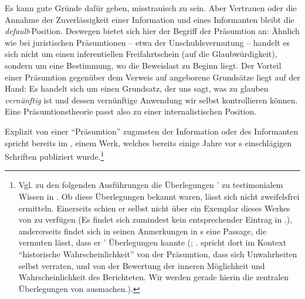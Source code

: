 Es kann gute Gründe dafür geben, misstrauisch zu sein. Aber Vertrauen oder die
Annahme der Zuverlässigkeit einer Information und eines Informanten bleibt die
\emph{default}-Position. Deswegen bietet sich hier der Begriff der Präsumtion
an: Ähnlich wie bei juristischen Präsumtionen -- etwa der Unschuldsvermutung --
handelt es sich nicht um einen inferentiellen Freifahrtschein (auf die
Glaubwürdigkeit), sondern um eine Bestimmung, wo die Beweislast zu Beginn liegt.
Der Vorteil einer Präsumtion gegenüber dem Verweis auf angeborene Grundsätze
liegt auf der Hand: Es handelt sich um einen Grundsatz, der uns sagt, was zu
glauben \emph{vernünftig} ist und dessen vernünftige Anwendung wir selbst
kontrollieren können. Eine Präsumtionstheorie passt also zu einer
internalistischen Position.


Explizit von einer \enquote{Präsumtion} zugunsten der Information oder des Informanten spricht bereits
 im , einem Werk, welches
bereits einige Jahre vor s einschlägigen Schriften publiziert
wurde.\footnote{\label{Anmerkung:KantundCrusiusPraesuppositionsTheorie}Vgl.
zu den folgenden Ausführungen die Überlegungen
' zu testimonialem Wissen in
\cite[][\S\S~605--627]{Crusius:WegzurGewissheitundZuverlaessigkeitdermenschlichenErkenntniss1965}.
Ob  diese Überlegungen bekannt waren, lässt sich nicht
zweifelsfrei ermitteln. Einerseits schien er selbst nicht über ein Exemplar
dieses Werkes von  zu
verfügen \mkbibparens{Es findet sich zumindest kein entsprechender Eintrag in
\cite{Warda:ImmanuelKantsBuecher1922}.}, andererseits findet sich in seinen
Anmerkungen in s  eine Passage, die vermuten lässt, dass er
' Überlegungen
kannte \mkbibparens{\cite[vgl.][]{Kant:Reflexionen1900ff.};
\cite[][XVI: 430.4--431.8]{Kant:GesammelteWerke1900ff.}. 
spricht dort im Kontext \enquote{historische Wahrscheinlichkeit} von der Präsumtion, dass
sich Unwahrheiten selbst verraten, und von der Bewertung der inneren Möglichkeit
und Wahrscheinlichkeit des Berichteten. Wir werden gerade hierin die zentralen
Überlegungen von 
ausmachen.}.} 
